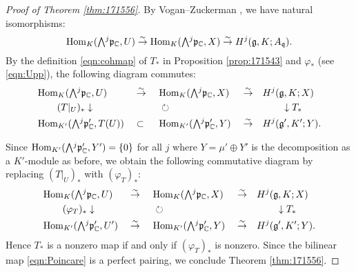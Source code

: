 \begin{proof}
[Proof of Theorem \ref{thm:171556}]
By Vogan--Zuckerman \cite[Cor.~3.7 and Prop.~3.2]{VZ}, 
 we have natural isomorphisms:
\begin{equation}
\label{eqn:gKp}
   {\operatorname{Hom}}_{K}(\Exterior^j {\mathfrak{p}}_{\mathbb{C}},U)
  \overset \sim \to
  {\operatorname{Hom}}_{K}(\Exterior^j {\mathfrak{p}}_{\mathbb{C}},X)
  \overset \sim \to 
  H^j ({\mathfrak{g}}, K; A_{\mathfrak{q}}).  
\end{equation}
By the definition \eqref{eqn:cohmap} of $T_{\ast}$
 in Proposition \ref{prop:171543}
 and $\varphi_{\ast}$ (see \eqref{eqn:Upp}), 
 the following diagram commutes:
\begin{alignat*}{5}
   &{\operatorname{Hom}}_{K}(\Exterior^j {\mathfrak{p}}_{\mathbb{C}},U)
   &&\overset \sim \to \,\,
   &&{\operatorname{Hom}}_{K}(\Exterior^j {\mathfrak{p}}_{\mathbb{C}},X)
   &&\overset \sim \to 
   &&H^j ({\mathfrak{g}}, K; X)
\\
   &\qquad (T|_U)_{\ast} \downarrow
   &&
   && \circlearrowright
   &&
   &&\qquad \downarrow T_{\ast}
\\
   &{\operatorname{Hom}}_{K'}(\Exterior^j {\mathfrak{p}}_{\mathbb{C}}',T(U))
  &&\subset
  &&{\operatorname{Hom}}_{K'}(\Exterior^j {\mathfrak{p}}_{\mathbb{C}}',Y)
  &&\overset \sim \to 
  &&H^j ({\mathfrak{g}}', K'; Y).  
\end{alignat*}



Since ${\operatorname{Hom}}_{K'}(\Exterior^j {\mathfrak{p}}_{\mathbb{C}}',Y') = \{0\}$
 for all $j$
 where $Y = \mu' \oplus Y'$ is the decomposition
 as a $K'$-module as before,
 we obtain the following commutative diagram
 by replacing $(T|_U)_{\ast}$ with $(\varphi_T)_{\ast}$:
\begin{alignat*}{5}
   &{\operatorname{Hom}}_{K}(\Exterior^j {\mathfrak{p}}_{\mathbb{C}},U)
   &&\overset \sim \to \,\,
   &&{\operatorname{Hom}}_{K}(\Exterior^j {\mathfrak{p}}_{\mathbb{C}},X)
   &&\overset\sim\to
   &&H^j ({\mathfrak{g}}, K; X)
\\
   &\qquad (\varphi_T)_{\ast} \downarrow
   &&
   && \circlearrowright
   &&
   &&\qquad \downarrow T_{\ast}
\\
   &{\operatorname{Hom}}_{K'}(\Exterior^j {\mathfrak{p}}_{\mathbb{C}}',U')
  &&\overset \sim \to
  &&{\operatorname{Hom}}_{K'}(\Exterior^j {\mathfrak{p}}_{\mathbb{C}}',Y)
  &&\overset\sim\to
  &&H^j ({\mathfrak{g}}', K'; Y).  
\end{alignat*}
Hence $T_{\ast}$ is a nonzero map
 if and only if $(\varphi_T)_{\ast}$ is nonzero.  
Since the bilinear map \eqref{eqn:Poincare} is a perfect pairing, 
 we conclude Theorem \ref{thm:171556}.  
\end{proof}

